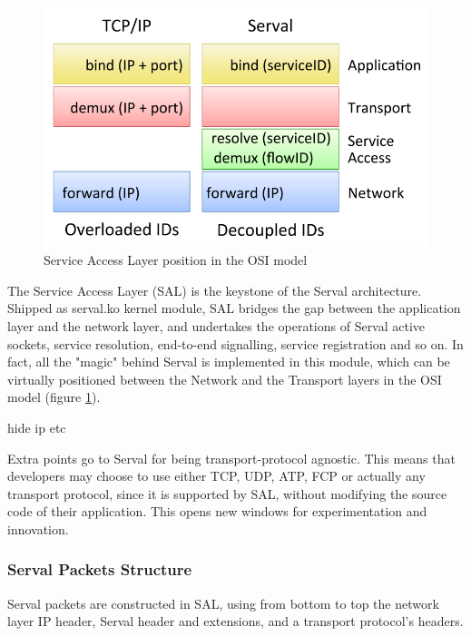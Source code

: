 \begin{figure}
\centering
{}
\includegraphics[scale=0.3]{figures/sal_position}
\caption[Service Access Layer position]{Service Access Layer position in the OSI model}
\label{fig:sal_position}
\end{figure}

The Service Access Layer (SAL) is the keystone of the Serval architecture.
Shipped as serval.ko kernel module, SAL bridges the gap between the application layer and the network layer, and undertakes the operations of Serval active sockets, service resolution, end-to-end signalling, service registration and so on.
In fact, all the "magic" behind Serval is implemented in this module, which can be virtually positioned between the Network and the Transport layers in the OSI model (figure \ref{fig:sal_position}).

hide ip etc


Extra points go to Serval for being transport-protocol agnostic.
This means that developers may choose to use either TCP, UDP, ATP, FCP or actually any transport protocol, since it is supported by SAL, without modifying the source code of their application.
This opens new windows for experimentation and innovation.



\subsubsection{Serval Packets Structure}
Serval packets are constructed in SAL, using from bottom to top the network layer IP header, Serval header and extensions, and a transport protocol's headers.

